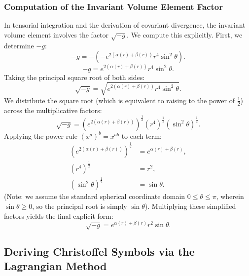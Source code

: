 \documentclass[11pt, a4paper]{report}
\begin{document}
\subsubsection{Computation of the Invariant Volume Element Factor}
In tensorial integration and the derivation of covariant divergence, the invariant volume element involves the factor $\sqrt{-g}$. We compute this explicitly. First, we determine $-g$:
\begin{equation}
-g = - \left( - e^{2(\alpha(r) + \beta(r))} r^4 \sin^2\theta \right).
\end{equation}
\begin{equation}
-g = e^{2(\alpha(r) + \beta(r))} r^4 \sin^2\theta.
\end{equation}
Taking the principal square root of both sides:
\begin{equation}
\sqrt{-g} = \sqrt{e^{2(\alpha(r) + \beta(r))} r^4 \sin^2\theta}.
\end{equation}
We distribute the square root (which is equivalent to raising to the power of $\frac{1}{2}$) across the multiplicative factors:
\begin{equation}
\sqrt{-g} = \left( e^{2(\alpha(r) + \beta(r))} \right)^{\frac{1}{2}} \left( r^4 \right)^{\frac{1}{2}} \left( \sin^2\theta \right)^{\frac{1}{2}}.
\end{equation}
Applying the power rule $(x^a)^b = x^{ab}$ to each term:
\begin{align}
\left( e^{2(\alpha(r) + \beta(r))} \right)^{\frac{1}{2}} &= e^{\alpha(r) + \beta(r)}, \\
\left( r^4 \right)^{\frac{1}{2}} &= r^2, \\
\left( \sin^2\theta \right)^{\frac{1}{2}} &= \sin\theta.
\end{align}
(Note: we assume the standard spherical coordinate domain $0 \leq \theta \leq \pi$, wherein $\sin\theta \geq 0$, so the principal root is simply $\sin\theta$).
Multiplying these simplified factors yields the final explicit form:
\begin{equation}
\sqrt{-g} = e^{\alpha(r) + \beta(r)} r^2 \sin\theta.
\end{equation}



\subsection*{Deriving Christoffel Symbols via the Lagrangian Method}
\end{document}
